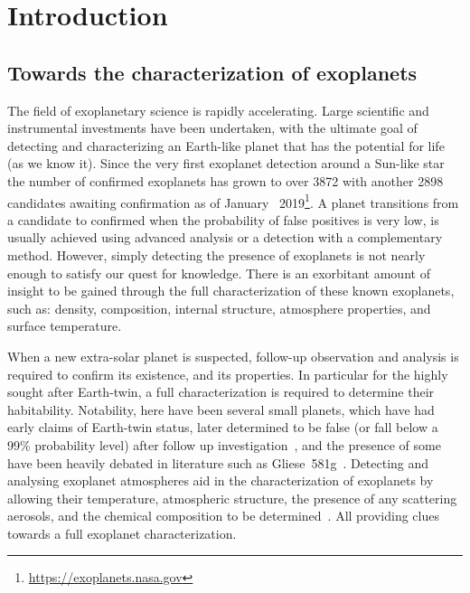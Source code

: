 
\chapter{Introduction}\label{cha:introduction}

\section{Towards the characterization of exoplanets}

The field of exoplanetary science is rapidly accelerating.
Large scientific and instrumental investments have been undertaken, with the ultimate goal of detecting and characterizing an Earth-like planet that has the potential for life (as we know it).
Since the very first exoplanet detection around a Sun-like star~\citep{mayor_jupitermass_1995} the number of confirmed exoplanets has grown to over 3872 with another 2898 candidates awaiting confirmation as of January~ 2019\footnote{\href{https://exoplanets.nasa.gov/}{https://exoplanets.nasa.gov}}.
A planet transitions from a candidate to confirmed when the probability of false positives is very low, is usually achieved using advanced analysis or a detection with a complementary method.
However, simply detecting the presence of exoplanets is not nearly enough to satisfy our quest for knowledge.
There is an exorbitant amount of insight to be gained through the full characterization of these known exoplanets, such as: density, composition, internal structure, atmosphere properties, and surface temperature.

When a new extra-solar planet is suspected, follow-up observation and analysis is required to confirm its existence, and its properties.
In particular for the highly sought after Earth-twin, a full characterization is required to determine their habitability.
Notability, here have been several small planets, which have had early claims of Earth-twin status, later determined to be false (or fall below a 99\% probability level) after follow up investigation~\citep[e.g.][]{mullally_kepler_2018,burke_reevaluating_2019}, and the presence of some have been heavily debated in literature such as {Gliese~581g}~\citep{vogt_lickcarnegie_2010, gregory_bayesian_2011,robertson_stellar_2014}.
Detecting and analysing exoplanet atmospheres aid in the characterization of exoplanets by allowing their temperature, atmospheric structure, the presence of any scattering aerosols, and the chemical composition to be determined~\citep[e.g.][and references therein]{kreidberg_exoplanet_2018}.
All providing clues towards a full exoplanet characterization.


